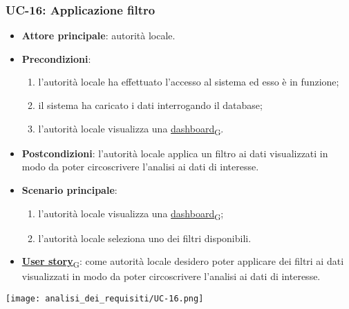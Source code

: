 \newpage
\subsubsection{UC-16: Applicazione filtro}
\begin{itemize}
	\item \textbf{Attore principale}: autorità locale.
	\item \textbf{Precondizioni}:
	      \begin{enumerate}
		      \item l'autorità locale ha effettuato l'accesso al sistema ed esso è in funzione;
		      \item il sistema ha caricato i dati interrogando il database;
		      \item l'autorità locale visualizza una \href{https://7last.github.io/docs/pb/documentazione-interna/glossario\#dashboard}{dashboard\textsubscript{G}}.
	      \end{enumerate}
	\item \textbf{Postcondizioni}: l'autorità locale applica un filtro ai dati visualizzati in modo da poter circoscrivere l'analisi ai dati di interesse.
	\item \textbf{Scenario principale}:
	      \begin{enumerate}
		      \item l'autorità locale visualizza una \href{https://7last.github.io/docs/pb/documentazione-interna/glossario\#dashboard}{dashboard\textsubscript{G}};
		      \item l'autorità locale seleziona uno dei filtri disponibili.
	      \end{enumerate}
	\item \href{https://7last.github.io/docs/pb/documentazione-interna/glossario\#user-story}{\textbf{User story}\textsubscript{G}}:
	      come autorità locale desidero poter applicare dei filtri ai dati visualizzati in modo da poter circoscrivere l'analisi ai dati di interesse.
\end{itemize}
\begin{center}
	\texttt{[image: analisi\_dei\_requisiti/UC-16.png]}
\end{center}

\newpage
